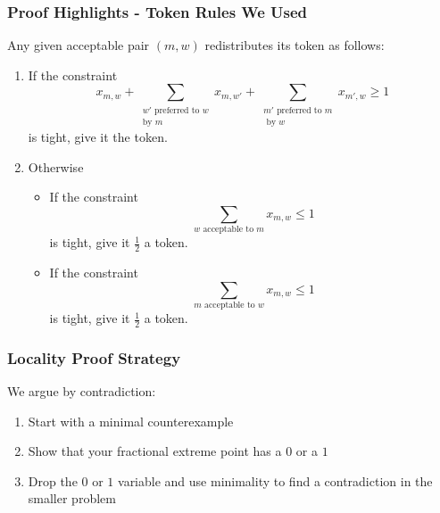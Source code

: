\documentclass[10pt]{beamer}
\begin{document}
\begin{frame}
\frametitle{Proof Highlights - Token Rules We Used}
Any given acceptable pair $(m,w)$ redistributes its token as follows:
\begin{enumerate}
\item \small If the constraint $$x_{m,w} + \sum_{\substack{w' \text{ preferred to $w$}\\ \text{by $m$}}} x_{m, w'} + \sum_{\substack{\text{$m'$ preferred to $m$}\\\text{ by $w$}}} x_{m',w} \geq 1$$
is tight, give it the token.
\item \small Otherwise
\begin{itemize}
\item If the constraint
$$\sum_{w \text{ acceptable to } m} x_{m,w} \leq 1 $$
is tight, give it $\frac{1}{2}$ a token.
\item \small If the constraint 
$$ \sum_{m \text{ acceptable to } w} x_{m,w} \leq 1$$
is tight, give it $\frac{1}{2}$ a token.
\end{itemize}
\end{enumerate}
\end{frame}

\begin{frame}
\frametitle{Locality Proof Strategy}
We argue by contradiction:
\begin{enumerate}
\item Start with a minimal counterexample
\item \alert<1>{Show that your fractional extreme point has a $0$ or a $1$}
\item \alert<2>{Drop the $0$ or $1$ variable and use minimality to find a contradiction in the smaller problem}
\end{enumerate}
\end{frame}
\end{document}
